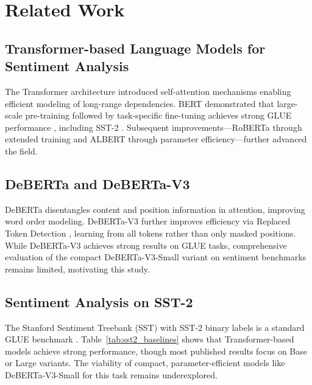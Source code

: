 \documentclass[pdflatex,sn-mathphys-num]{sn-jnl}
\theoremstyle{thmstyleone}%
\theoremstyle{thmstyletwo}%
\theoremstyle{thmstylethree}%
\begin{document}
\section{Related Work}\label{sec2}

\subsection{Transformer-based Language Models for Sentiment Analysis}

The Transformer architecture \cite{vaswani2017attention} introduced self-attention mechanisms enabling efficient modeling of long-range dependencies. BERT \cite{devlin2019bert} demonstrated that large-scale pre-training followed by task-specific fine-tuning achieves strong GLUE performance \cite{wang2018glue}, including SST-2 \cite{socher2013sst}. Subsequent improvements—RoBERTa \cite{liu2019roberta} through extended training and ALBERT \cite{lan2020albert} through parameter efficiency—further advanced the field.

\subsection{DeBERTa and DeBERTa-V3}

DeBERTa \cite{he2021deberta} disentangles content and position information in attention, improving word order modeling. DeBERTa-V3 \cite{he2023debertav3} further improves efficiency via Replaced Token Detection \cite{clark2020electra}, learning from all tokens rather than only masked positions. While DeBERTa-V3 achieves strong results on GLUE tasks, comprehensive evaluation of the compact DeBERTa-V3-Small variant on sentiment benchmarks remains limited, motivating this study.

\subsection{Sentiment Analysis on SST-2}

The Stanford Sentiment Treebank (SST) \cite{socher2013sst} with SST-2 binary labels is a standard GLUE benchmark \cite{wang2018glue}. Table~\ref{tab:sst2_baselines} shows that Transformer-based models achieve strong performance, though most published results focus on Base or Large variants. The viability of compact, parameter-efficient models like DeBERTa-V3-Small for this task remains underexplored.
\end{document}
